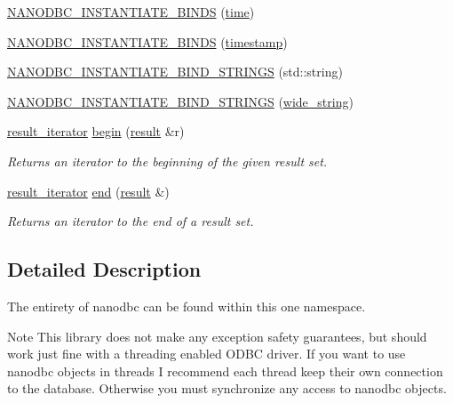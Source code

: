 \begin{DoxyCompactItemize}
\mbox{\hyperlink{namespacenanodbc_ad4b04e6da98b27ba43decc4e3757ff4a}{N\+A\+N\+O\+D\+B\+C\+\_\+\+I\+N\+S\+T\+A\+N\+T\+I\+A\+T\+E\+\_\+\+B\+I\+N\+DS}} (\mbox{\hyperlink{structnanodbc_1_1time}{time}})
\item 
\mbox{\hyperlink{namespacenanodbc_a7c4809d9487f6f871beaab2909ddc7e5}{N\+A\+N\+O\+D\+B\+C\+\_\+\+I\+N\+S\+T\+A\+N\+T\+I\+A\+T\+E\+\_\+\+B\+I\+N\+DS}} (\mbox{\hyperlink{structnanodbc_1_1timestamp}{timestamp}})
\item 
\mbox{\hyperlink{namespacenanodbc_affb3519ec607369744551f28d664ad1e}{N\+A\+N\+O\+D\+B\+C\+\_\+\+I\+N\+S\+T\+A\+N\+T\+I\+A\+T\+E\+\_\+\+B\+I\+N\+D\+\_\+\+S\+T\+R\+I\+N\+GS}} (std\+::string)
\item 
\mbox{\hyperlink{namespacenanodbc_a03d2a4acfe2dcbde590724c5103c42b7}{N\+A\+N\+O\+D\+B\+C\+\_\+\+I\+N\+S\+T\+A\+N\+T\+I\+A\+T\+E\+\_\+\+B\+I\+N\+D\+\_\+\+S\+T\+R\+I\+N\+GS}} (\mbox{\hyperlink{namespacenanodbc_aeddf33f0df2bb9ba05323112e3aed316}{wide\+\_\+string}})
\item 
\mbox{\hyperlink{classnanodbc_1_1result__iterator}{result\+\_\+iterator}} \mbox{\hyperlink{group__mainc_gac6e8e0e4c603c1bbfc0c7db3a58919f0}{begin}} (\mbox{\hyperlink{classnanodbc_1_1result}{result}} \&r)
\begin{DoxyCompactList}\small\item\em Returns an iterator to the beginning of the given result set. \end{DoxyCompactList}\item 
\mbox{\hyperlink{classnanodbc_1_1result__iterator}{result\+\_\+iterator}} \mbox{\hyperlink{group__mainc_ga91df79a3401b5afd4ec109101737b05b}{end}} (\mbox{\hyperlink{classnanodbc_1_1result}{result}} \&)
\begin{DoxyCompactList}\small\item\em Returns an iterator to the end of a result set. \end{DoxyCompactList}\end{DoxyCompactItemize}


\subsection{Detailed Description}
The entirety of nanodbc can be found within this one namespace. 

\begin{DoxyNote}{Note}
This library does not make any exception safety guarantees, but should work just fine with a threading enabled O\+D\+BC driver. If you want to use nanodbc objects in threads I recommend each thread keep their own connection to the database. Otherwise you must synchronize any access to nanodbc objects. 
\end{DoxyNote}


